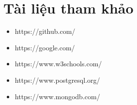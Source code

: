 \section{Tài liệu tham khảo}

\begin{itemize}
    \item https://github.com/
    \item https://google.com/
    \item https://www.w3schools.com/
    \item https://www.postgresql.org/
    \item https://www.mongodb.com/
\end{itemize}